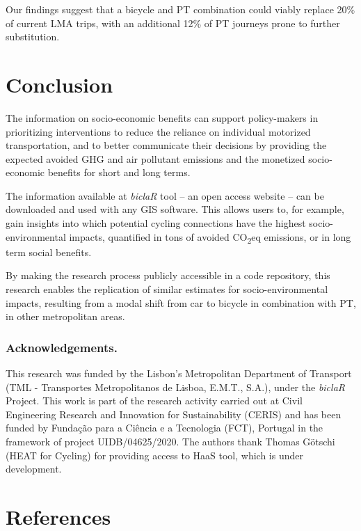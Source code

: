 \documentclass[runningheads]{llncs}
\begin{document}
Our findings suggest that a bicycle and PT combination could viably
replace 20\% of current LMA trips, with an additional 12\% of PT
journeys prone to further substitution.

\hypertarget{conclusion}{%
\section{Conclusion}\label{conclusion}}

The information on socio-economic benefits can support policy-makers in
prioritizing interventions to reduce the reliance on individual
motorized transportation, and to better communicate their decisions by
providing the expected avoided GHG and air pollutant emissions and the
monetized socio-economic benefits for short and long terms.

The information available at \emph{biclaR} tool -- an open access
website -- can be downloaded and used with any GIS software. This allows
users to, for example, gain insights into which potential cycling
connections have the highest socio-environmental impacts, quantified in
tons of avoided CO\textsubscript{2}eq emissions, or in long term social
benefits.

By making the research process publicly accessible in a code repository,
this research enables the replication of similar estimates for
socio-environmental impacts, resulting from a modal shift from car to
bicycle in combination with PT, in other metropolitan areas.

\hypertarget{acknowledgements.}{%
\subsubsection*{Acknowledgements.}\label{acknowledgements.}}

This research was funded by the Lisbon's Metropolitan Department of
Transport (TML - Transportes Metropolitanos de Lisboa, E.M.T., S.A.),
under the \emph{biclaR} Project. This work is part of the research
activity carried out at Civil Engineering Research and Innovation for
Sustainability (CERIS) and has been funded by Fundação para a Ciência e
a Tecnologia (FCT), Portugal in the framework of project
UIDB/04625/2020. The authors thank Thomas Götschi (HEAT for Cycling) for
providing access to HaaS tool, which is under development.

\hypertarget{references}{%
\section*{References}\label{references}}
\end{document}
